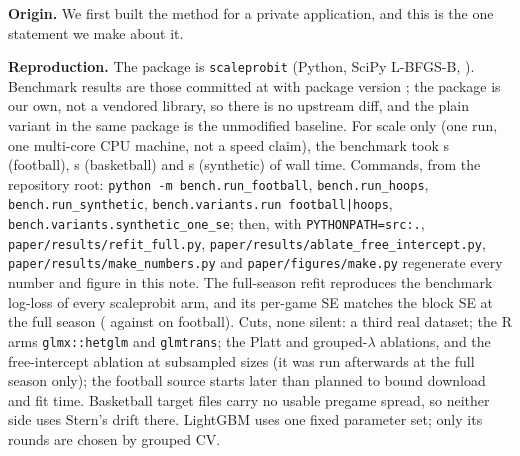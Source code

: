 \documentclass{article}
\begin{document}
\textbf{Origin.} We first built the method for a private application, and this is the one statement we make about it. \privateline

{\raggedright
\textbf{Reproduction.} The package is \texttt{scaleprobit} (Python, SciPy L-BFGS-B, \citealp{virtanen2020scipy}).
Benchmark results are those committed at \texttt{\nResultsCommit} with package version \nPkgVersion; the package is our own, not a vendored library, so there is no upstream diff, and the plain variant in the same package is the unmodified baseline.
For scale only (one run, one multi-core CPU machine, not a speed claim), the benchmark took \nFbWallS{} s (football), \nHpWallS{} s (basketball) and \nSynWallS{} s (synthetic) of wall time.
Commands, from the repository root: \texttt{python -m bench.run\_football}, \texttt{bench.run\_hoops}, \texttt{bench.run\_synthetic}, \texttt{bench.variants.run football|hoops}, \texttt{bench.variants.synthetic\_one\_se}; then, with \texttt{PYTHONPATH=src:.}, \texttt{paper/results/refit\_full.py}, \texttt{paper/results/ablate\_free\_intercept.py}, \texttt{paper/results/make\_numbers.py} and \texttt{paper/figures/make.py} regenerate every number and figure in this note.
The full-season refit reproduces the benchmark log-loss of every scaleprobit arm, and its per-game SE matches the block SE at the full season (\nFbFullSeGameTO{} against \nFbFullSeBlockTO{} on football).
Cuts, none silent: a third real dataset; the R arms \texttt{glmx::hetglm} \citep{zeileis_glmx} and \texttt{glmtrans}; the Platt and grouped-$\lambda$ ablations, and the free-intercept ablation at subsampled sizes (it was run afterwards at the full season only); the football source starts later than planned to bound download and fit time.
Basketball target files carry no usable pregame spread, so neither side uses Stern's drift there.
LightGBM uses one fixed parameter set; only its rounds are chosen by grouped CV.
\par}
\end{document}
